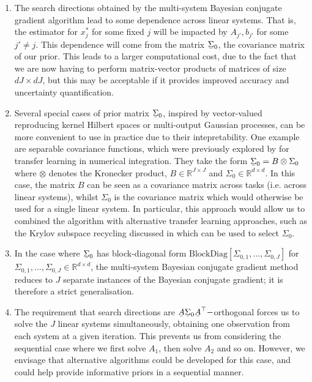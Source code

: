 \documentclass[twoside]{article}
\newcommand\barbelow[1]{\stackunder[1.2pt]{$#1$}{\rule{.8ex}{.075ex}}}
\begin{document}
\begin{enumerate}

	\item The search directions obtained by the multi-system Bayesian conjugate gradient algorithm lead to some dependence across linear systems. That is, the estimator for $x_j^*$ for some fixed $j$ will be impacted by $A_{j'},b_{j'}$ for some $j' \neq j$. This dependence will come from the matrix $\barbelow{\Sigma}_0$, the covariance matrix of our prior. This leads to a larger computational cost, due to the fact that we are now having to perform matrix-vector products of matrices of size $dJ \times dJ$, but this may be acceptable if it provides improved accuracy and uncertainty quantification.

	\item Several special cases of prior matrix $\barbelow{\Sigma}_0$, inspired by vector-valued reproducing kernel Hilbert spaces or multi-output Gaussian processes, can be more convenient to use in practice due to their intepretability. One example are separable covariance functions, which were previously explored by \cite{Xi2018MultiOutput} for transfer learning in numerical integration. They take the form $\barbelow{\Sigma}_{0}= B \otimes \Sigma_{0}$ where $\otimes$ denotes the Kronecker product, $B \in \mathbb{R}^{J \times J}$ and $\Sigma_0 \in \mathbb{R}^{d \times d}$. In this case, the matrix $B$ can be seen as a covariance matrix across tasks (i.e. across linear systems), whilst $\Sigma_0$ is the covariance matrix which would otherwise be used for a single linear system. In particular, this approach would allow us to combined the algorithm with alternative transfer learning approaches, such as the Krylov subspace recycling discussed in \cite{DeRoos2017} which can be used to select $\Sigma_0$.

	\item In the case where $\barbelow{\Sigma}_0$ has block-diagonal form $\text{BlockDiag}\left[\Sigma_{0,1},\ldots,\Sigma_{0,J}\right]$ for $\Sigma_{0,1},\ldots,\Sigma_{0,J} \in \mathbb{R}^{d \times d}$, the multi-system Bayesian conjugate gradient method reduces to $J$ separate instances of the Bayesian conjugate gradient; it is therefore a strict generalisation.


	\item The requirement that search directions are $\barbelow{A} \barbelow{\Sigma}_0 \barbelow{A}^\top-$orthogonal forces us to solve the $J$ linear systems simultaneously, obtaining one observation from each system at a given iteration. This prevents us from considering the sequential case where we first solve $A_1$, then solve $A_2$ and so on. However, we envisage that alternative algorithms could be developed for this case, and could help provide informative priors in a sequential manner.

\end{enumerate}



\end{document}
